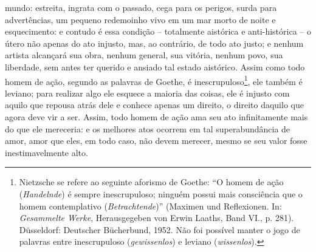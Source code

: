 mundo: estreita, ingrata com o passado, cega para os perigos, surda para
advertências, um pequeno redemoinho vivo em um mar morto de noite e
esquecimento: e contudo é essa condição -- totalmente aistórica e
anti-histórica -- o útero não apenas do ato injusto, mas, ao contrário,
de todo ato justo; e nenhum artista alcançará sua obra, nenhum general,
sua vitória, nenhum povo, sua liberdade, sem antes ter querido e ansiado
tal estado aistórico. Assim como todo homem de ação, segundo as palavras
de Goethe, é inescrupuloso\footnote{Nietzsche se refere ao seguinte
  aforismo de Goethe: ``O homem de ação (\emph{Handelnde}) é sempre
  inescrupuloso; ninguém possui mais consciência que o homem
  contemplativo (\emph{Betrachtende})'' (Maximen und Reflexionen.
  In: \emph{Gesammelte Werke}, Herausgegeben von Erwin Laaths, Band VI.,
  p. 281). Düsseldorf: Deutscher Bücherbund, 1952. Não foi possível
  manter o jogo de palavras entre inescrupuloso (\emph{gewissenlos}) e
  leviano (\emph{wissenlos}).}, ele também é leviano; para realizar algo
ele esquece a maioria das coisas, ele é injusto com aquilo que repousa
atrás dele e conhece apenas um direito, o direito daquilo que agora deve
vir a ser. Assim, todo homem de ação ama seu ato infinitamente mais do
que ele mereceria: e os melhores atos ocorrem em tal superabundância de
amor, amor que eles, em todo caso, não devem merecer, mesmo se seu
valor fosse inestimavelmente alto.

